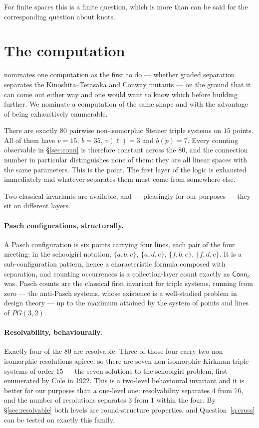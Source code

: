 \documentclass[11pt]{article}
\theoremstyle{plain}
\theoremstyle{definition}
\newcommand{\Conn}{\mathsf{Conn}}
\begin{document}
For finite spaces this is a finite question, which is more than can be said for the corresponding
question about knots.

\section{The computation}
\label{sec:sts}

\cite[\S7]{Classifier} nominates one computation as the first to do --- whether graded separation
separates the Kinoshita--Terasaka and Conway mutants --- on the ground that it can come out either
way and one would want to know which before building further. We nominate a computation of the
same shape and with the advantage of being exhaustively enumerable.

There are exactly $80$ pairwise non-isomorphic Steiner triple systems on $15$ points. All of them
have $v = 15$, $b = 35$, $v(\ell) = 3$ and $b(p) = 7$. Every counting observable in
\S\ref{sec:conn} is therefore constant across the $80$, and the connection number in particular
distinguishes none of them: they are all linear spaces with the same parameters. This is the point.
The first layer of the logic is exhausted immediately and whatever separates them must come from
somewhere else.

Two classical invariants are available, and --- pleasingly for our purposes --- they sit on
different layers.

\paragraph{Pasch configurations, structurally.} A Pasch configuration is six points carrying four
lines, each pair of the four meeting: in the schoolgirl notation, $\{a,b,c\}$, $\{a,d,e\}$,
$\{f,b,e\}$, $\{f,d,c\}$. It is a sub-configuration pattern, hence a characteristic formula
composed with separation, and counting occurrences is a collection-layer count exactly as
$\Conn_\kappa$ was. Pasch counts are the classical first invariant for triple systems, running from
zero --- the anti-Pasch systems, whose existence is a well-studied problem in design theory --- up
to the maximum attained by the system of points and lines of $PG(3,2)$.

\paragraph{Resolvability, behaviourally.} Exactly four of the $80$ are resolvable. Three of those
four carry two non-isomorphic resolutions apiece, so there are seven non-isomorphic Kirkman triple
systems of order $15$ --- the seven solutions to the schoolgirl problem, first enumerated by Cole in
1922. This is a two-level behavioural invariant and it is better for our purposes than a one-level
one: resolvability separates $4$ from $76$, and the number of resolutions separates $3$ from $1$
within the four. By \S\ref{sec:resolvable} both levels are round-structure properties, and
Question~\ref{q:cross} can be tested on exactly this family.
\end{document}
